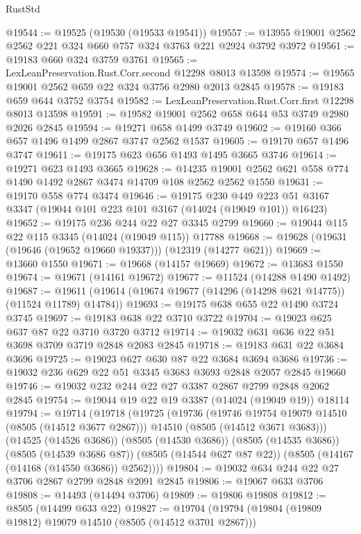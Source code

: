 \begin{lexlean}{RustStd}
\begin{coremodule}
@19544 := @19525 (@19530 (@19533 @19541))
@19557 := @13955 @19001 @2562 @2562 @221 @324 @660 @757 @324 @3763 @221 @2924 @3792 @3972
@19561 := @19183 @660 @324 @3759 @3761
@19565 := LexLeanPreservation.Rust.Corr.second @12298 @8013 @13598
@19574 := @19565 @19001 @2562 @659 @22 @324 @3756 @2980 @2013 @2845
@19578 := @19183 @659 @644 @3752 @3754
@19582 := LexLeanPreservation.Rust.Corr.first @12298 @8013 @13598
@19591 := @19582 @19001 @2562 @658 @644 @53 @3749 @2980 @2026 @2845
@19594 := @19271 @658 @1499 @3749
@19602 := @19160 @366 @657 @1496 @1499 @2867 @3747 @2562 @1537
@19605 := @19170 @657 @1496 @3747
@19611 := @19175 @623 @656 @1493 @1495 @3665 @3746
@19614 := @19271 @623 @1493 @3665
@19628 := @14235 @19001 @2562 @621 @558 @774 @1490 @1492 @2867 @3474 @14709 @108 @2562 @2562 @1550
@19631 := @19170 @558 @774 @3474
@19646 := @19175
    @230
    @449
    @223
    @51
    @3167
    @3347
    (@19044 @101 @223 @101 @3167 (@14024 (@19049 @101)) @16423)
@19652 := @19175 @236 @244 @22 @27 @3345 @2799
@19660 := @19044 @115 @22 @115 @3345 (@14024 (@19049 @115)) @17788
@19668 := @19628 (@19631 (@19646 (@19652 @19660 @19337))) (@12319 (@14277 @621))
@19669 := @13660 @1550
@19671 := @19668 (@14157 @19669)
@19672 := @13683 @1550
@19674 := @19671 (@14161 @19672)
@19677 := @11524 (@14288 @1490 @1492)
@19687 := @19611 (@19614 (@19674 @19677 (@14296 (@14298 @621 @14775)) (@11524 @11789) @14784))
@19693 := @19175 @638 @655 @22 @1490 @3724 @3745
@19697 := @19183 @638 @22 @3710 @3722
@19704 := @19023 @625 @637 @87 @22 @3710 @3720 @3712
@19714 := @19032 @631 @636 @22 @51 @3698 @3709 @3719 @2848 @2083 @2845
@19718 := @19183 @631 @22 @3684 @3696
@19725 := @19023 @627 @630 @87 @22 @3684 @3694 @3686
@19736 := @19032 @236 @629 @22 @51 @3345 @3683 @3693 @2848 @2057 @2845 @19660
@19746 := @19032 @232 @244 @22 @27 @3387 @2867 @2799 @2848 @2062 @2845
@19754 := @19044 @19 @22 @19 @3387 (@14024 (@19049 @19)) @18114
@19794 := @19714
    (@19718
      (@19725
        (@19736
          (@19746 @19754 @19079 @14510 (@8505 (@14512 @3677 @2867)))
          @14510
          (@8505 (@14512 @3671 @3683)))
        (@14525 (@14526 @3686))
        (@8505 (@14530 @3686))
        (@8505 (@14535 @3686))
        (@8505 (@14539 @3686 @87))
        (@8505 (@14544 @627 @87 @22))
        (@8505 (@14167 (@14168 (@14550 @3686)) @2562))))
@19804 := @19032 @634 @244 @22 @27 @3706 @2867 @2799 @2848 @2091 @2845
@19806 := @19067 @633 @3706
@19808 := @14493 (@14494 @3706)
@19809 := @19806 @19808
@19812 := @8505 (@14499 @633 @22)
@19827 := @19704
    (@19794
      (@19804 (@19809 @19812) @19079 @14510 (@8505 (@14512 @3701 @2867)))

\end{coremodule}
\end{lexlean}
